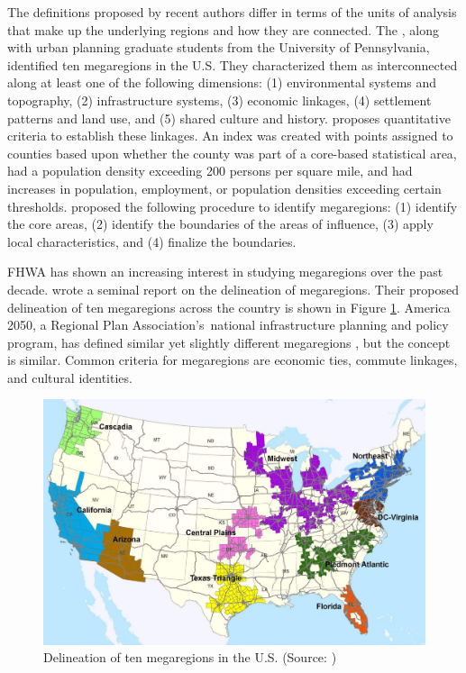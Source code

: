 The definitions proposed by recent authors differ in terms of the units of analysis that make up the underlying regions and how they are connected. The \cite{rpa06}, along with urban planning graduate students from the University of Pennsylvania, identified ten megaregions in the U.S. They characterized them as interconnected along at least one of the following dimensions: (1) environmental systems and topography, (2) infrastructure systems, (3) economic linkages, (4) settlement patterns and land use, and (5) shared culture and history. \cite{hagler09} proposes quantitative criteria to establish these linkages. An index was created with points assigned to counties based upon whether the county was part of a core-based statistical area, had a population density exceeding 200 persons per square mile, and had increases in population, employment, or population densities exceeding certain thresholds. \cite{ross08} proposed the following procedure to identify megaregions: (1) identify the core areas, (2) identify the boundaries of the areas of influence, (3) apply local characteristics, and (4) finalize the boundaries.

FHWA has shown an increasing interest in studying megaregions over the past decade. \cite{ross09c} wrote a seminal report on the delineation of megaregions. Their proposed delineation of ten megaregions across the country is shown in Figure \ref{fig:ross-megaregions}. America 2050, a Regional Plan Association's~national infrastructure planning and policy program, has defined similar yet slightly different megaregions \citep{rpa06}, but the concept is similar. Common criteria for megaregions are economic ties, commute linkages, and cultural identities.

\begin{figure}[!tb]
\centering
\includegraphics[width=6.5in]{graphics/02-megaregionsAccordingToRoss2009}
\caption[Delineation of ten megaregions in the U.S.]{Delineation of ten megaregions in the U.S. (Source: \cite{ross09b})}
\label{fig:ross-megaregions}
\end{figure}

